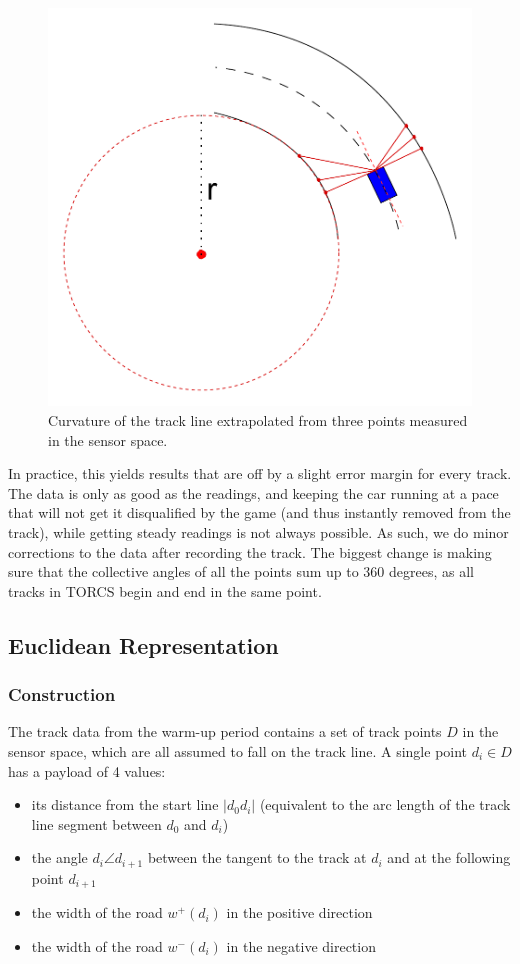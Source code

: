 \documentclass[conference]{IEEEtran}
\begin{document}
\begin{figure}
\centerline{\includegraphics[width=0.8\columnwidth]{Curvature.pdf}}
\caption{Curvature of the track line extrapolated from three points measured in the sensor space.}
\label{fig-curvature}
\end{figure}

In practice, this yields results that are off by a slight error margin for every track. The data is only as good as the readings, and keeping the car running at a pace that will not get it disqualified by the game (and thus instantly removed from the track), while getting steady readings is not always possible. As such, we do minor corrections to the data after recording the track. The biggest change is making sure that the collective angles of all the points sum up to 360 degrees, as all tracks in TORCS begin and end in the same point.

\subsection{Euclidean Representation}
\subsubsection{Construction}
The track data from the warm-up period contains a set of track points $D$ in the sensor space, which are all assumed to fall on the track line. A single point $d_i \in D$ has a payload of 4 values:
\begin{itemize}
\item its distance from the start line $|d_0 d_i|$ (equivalent to the arc length of the track line segment between $d_0$ and $d_i$)
\item the angle $d_i \angle d_{i+1}$ between the tangent to the track at $d_i$ and at the following point $d_{i+1}$
\item the width of the road $w^+(d_i)$ in the positive direction
\item the width of the road $w^-(d_i)$ in the negative direction
\end{itemize}
\end{document}
